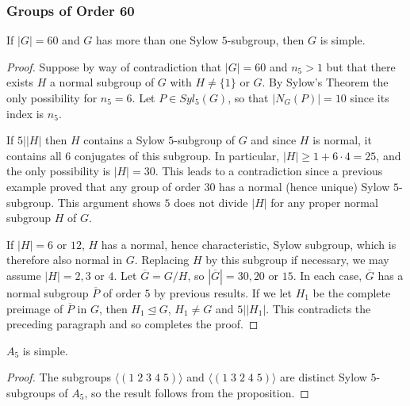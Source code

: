 \documentclass[12pt, a4paper, oneside, openright, titlepage]{book}
\begin{document}
\subsubsection{Groups of Order 60}

\begin{prop}
    If $|G| = 60$ and $G$ has more than one Sylow $5$-subgroup, then $G$ is simple.
\end{prop}
\begin{proof}
    Suppose by way of contradiction that $|G| = 60$ and $n_5 > 1$ but that there exists $H$ a normal subgroup of $G$ with $H \neq \{1\}$ or $G$. By Sylow's Theorem the only possibility for $n_5 = 6$. Let $P \in Syl_5(G)$, so that $|N_G(P)| = 10$ since its index is $n_5$.

    If $5\vert |H|$ then $H$ contains a Sylow $5$-subgroup of $G$ and since $H$ is normal, it contains all $6$ conjugates of this subgroup. In particular, $|H| \geq 1 + 6\cdot 4 = 25$, and the only possibility is $|H| = 30$. This leads to a contradiction since a previous example proved that any group of order $30$ has a normal (hence unique) Sylow $5$-subgroup. This argument shows $5$ does not divide $|H|$ for any proper normal subgroup $H$ of $G$.

    If $|H| = 6$ or $12$, $H$ has a normal, hence characteristic, Sylow subgroup, which is therefore also normal in $G$. Replacing $H$ by this subgroup if necessary, we may assume $|H| = 2,3$ or $4$. Let $\overline{G} = G/H$, so $|\overline{G}| = 30, 20$ or $15$. In each case, $\overline{G}$ has a normal subgroup $\overline{P}$ of order $5$ by previous results. If we let $H_1$ be the complete preimage of $\overline{P}$ in $G$, then $H_1 \trianglelefteq G$, $H_1 \neq G$ and $5\vert |H_1|$. This contradicts the preceding paragraph and so completes the proof.
\end{proof}

\begin{cor}
    $A_5$ is simple.
\end{cor}
\begin{proof}
    The subgroups $\langle (1\;2\;3\;4\;5)\rangle$ and $\langle (1\;3\;2\;4\;5)\rangle$ are distinct Sylow $5$-subgroups of $A_5$, so the result follows from the proposition.
\end{proof}
\end{document}
